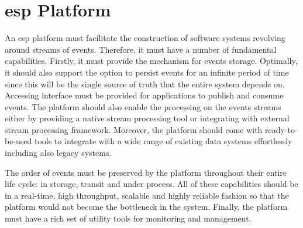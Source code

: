 \section{\acrlong{esp} Platform}
An \acrlong{esp} platform must facilitate the construction of software systems revolving around streams of events. Therefore, it must have a number of fundamental capabilities. Firstly, it must provide the mechanism for events storage. Optimally, it should also support the option to persist events for an infinite period of time since this will be the single source of truth that the entire system depends on. Accessing interface must be provided for applications to publish and consume events. The platform should also enable the processing on the events streams either by providing a native stream processing tool or integrating with external stream processing framework. Moreover, the platform should come with ready-to-be-used tools to integrate with a wide range of existing data systems effortlessly including also legacy systems.

The order of events must be preserved by the platform throughout their entire life cycle: in storage, transit and under process. All of these capabilities should be in a real-time, high throughput, scalable and highly reliable fashion so that the platform would not become the bottleneck in the system. Finally, the platform must have a rich set of utility tools for monitoring and management.



